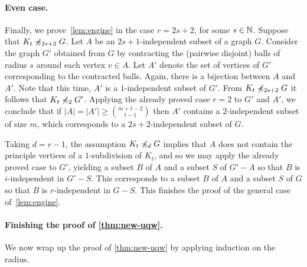  
 \paragraph{Even case.}
 Finally,
 we prove~\cref{lem:engine} in the case $r=2s+2$, for some $s\in \mathbb{N}$. Suppose that $K_t\not\preccurlyeq_{2s+2} G$.
 Let $A$ be an $2s+1$-independent subset of a graph $G$. Consider the graph $G'$ obtained from $G$
by contracting the (pairwise disjoint) balls of radius $s$ around each vertex $v\in A$.
 Let $A'$ denote the set of vertices of $G'$ corresponding to the contracted balls. Again, there is a bijection between $A$ and $A'$. Note that
this time, $A'$ is a $1$-independent subset of $G'$.
From $K_t\not\preccurlyeq_{2s+2} G$ it follows that $K_t\not\preccurlyeq_2 G'$. Applying the already proved case $r=2$ to $G'$ and $A'$, we conclude that 
if $|A|=|A'|\ge {m+t-2\choose t-1}$ then
 $A'$ contains a $2$-independent subset of size $m$,
 which corresponds to a $2s+2$-independent subset of $G$.
 
 
 
Taking $d=r-1$, the assumption $K_t\not\preccurlyeq_d G$
implies that $A$ does not contain the principle vertices of a $1$-subdivision of $K_t$, and so we may apply the already proved case to $G'$, yielding a subset $B$ of $A$ and a subset $S$ of $G'-A$
so that $B$ is $i$-independent in $G'-S$. 
This corresponds to a subset $B$ of $A$ and a subset $S$ of $G$
so that $B$ is $r$-independent in $G-S$.
This finishes  the proof of the general case of~\cref{lem:engine}.



\paragraph*{Finishing the proof of \cref{thm:new-uqw}.}
We now wrap up the proof of \cref{thm:new-uqw} by applying induction on the radius. 

